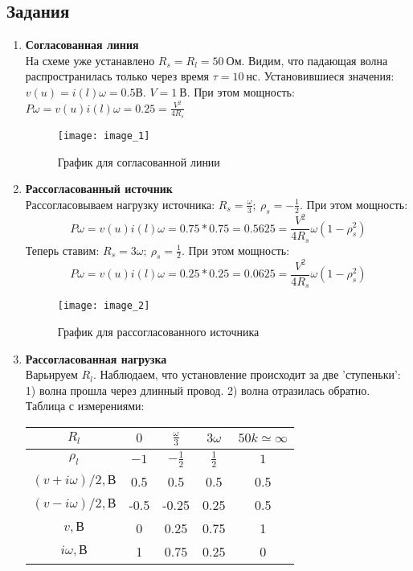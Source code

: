 \subsection*{Задания}
\begin{enumerate}
\item\textbf{Согласованная линия}\\
На схеме уже устанавлено $R_s = R_l = 50\ Ом$. Видим, что падающая волна распространилась только через время $\tau = 10\ нс$. Установившиеся значения: $v(u) = i(l)\omega = 0.5 В$. $V = 1 \ В$. При этом мощность: $P\omega = v(u)i(l)\omega = 0.25 = \frac{V^2}{4R_s}$
\begin{figure}[!h]
	\centering\texttt{[image: image\_1]}
	\caption{График для согласованной линии}
	\label{fig:image_1}
\end{figure}

\item\textbf{Рассогласованный источник}\\
	Рассогласовываем нагрузку источника: $R_s = \frac{\omega}{3};\ \rho_s = -\frac{1}{2}$. При этом мощность: 
$$
P\omega = v(u)i(l)\omega = 0.75 * 0.75 = 0.5625 = \frac{V^2}{4R_s}\omega(1-\rho_s^2)
$$
Теперь ставим: $R_s = 3\omega;\ \rho_s = \frac{1}{2}$. При этом мощность: 
$$
P\omega = v(u)i(l)\omega = 0.25 * 0.25 = 0.0625 = 			\frac{V^2}{4R_s}\omega(1-\rho_s^2)
$$
\begin{figure}[!h]
	\centering\texttt{[image: image\_2]}
	\caption{График для рассогласованного источника}
	\label{fig:image_2}
\end{figure}

\item\textbf{Рассогласованная нагрузка}\\
	Варьируем $R_l$. Наблюдаем, что установление происходит за две 'ступеньки': 1) волна прошла через длинный провод. 2) волна отразилась обратно. Таблица с измерениями:
\begin{table}[!h]
	\centering
	\begin{tabular}{|c|c|c|c|c|} \hline
		$R_l$ & $0$ & $\frac{\omega}{3}$ & $3\omega$ & $50k \simeq \infty$ \\ \hline 
		$\rho_l$ & $-1$ & $-\frac{1}{2}$ & $\frac{1}{2}$ & $1$ \\ \hline
		$(v + i\omega)/2, В$ & 0.5 & 0.5 & 0.5 & 0.5 \\ \hline
		$(v - i\omega)/2, В$ & -0.5 & -0.25 & 0.25 & 0.5 \\ \hline
		$v, В$ & 0 & 0.25 & 0.75 & 1 \\ \hline
		$i\omega, В$ & 1 & 0.75 & 0.25 & 0 \\ \hline
	\end{tabular}
\end{table}


\end{enumerate}
